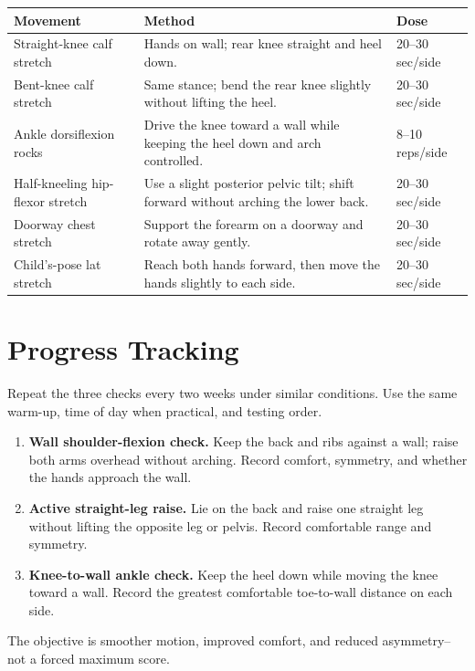 \documentclass[10pt,letterpaper]{article}
\begin{document}
\begin{tabularx}{\textwidth}{@{}L{1.72in}Y C{1.25in}@{}}
\toprule
{}
\color{white}\textbf{Movement} & \color{white}\textbf{Method} & \color{white}\textbf{Dose} \\
\midrule
Straight-knee calf stretch & Hands on wall; rear knee straight and heel down. & 20--30 sec/side \\
Bent-knee calf stretch & Same stance; bend the rear knee slightly without lifting the heel. & 20--30 sec/side \\
Ankle dorsiflexion rocks & Drive the knee toward a wall while keeping the heel down and arch controlled. & 8--10 reps/side \\
Half-kneeling hip-flexor stretch & Use a slight posterior pelvic tilt; shift forward without arching the lower back. & 20--30 sec/side \\
Doorway chest stretch & Support the forearm on a doorway and rotate away gently. & 20--30 sec/side \\
Child's-pose lat stretch & Reach both hands forward, then move the hands slightly to each side. & 20--30 sec/side \\
\bottomrule
\end{tabularx}

\Needspace{0.34\textheight}
\section{Progress Tracking}

Repeat the three checks every two weeks under similar conditions. Use the same warm-up, time of day when practical, and testing order.

\begin{enumerate}
  \item \textbf{Wall shoulder-flexion check.} Keep the back and ribs against a wall; raise both arms overhead without arching. Record comfort, symmetry, and whether the hands approach the wall.
  \item \textbf{Active straight-leg raise.} Lie on the back and raise one straight leg without lifting the opposite leg or pelvis. Record comfortable range and symmetry.
  \item \textbf{Knee-to-wall ankle check.} Keep the heel down while moving the knee toward a wall. Record the greatest comfortable toe-to-wall distance on each side.
\end{enumerate}

The objective is smoother motion, improved comfort, and reduced asymmetry--not a forced maximum score.
\end{document}
